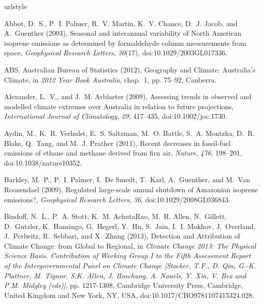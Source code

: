 \documentclass[draft,linenumbers]{AGUJournal}
\begin{document}
\begin{thebibliography}{51}
\providecommand{\natexlab}[1]{#1}
\expandafter\ifx\csname urlstyle\endcsname\relax
  \providecommand{\doi}[1]{doi:\discretionary{}{}{}#1}\else
  \providecommand{\doi}{doi:\discretionary{}{}{}\begingroup
  \urlstyle{rm}\Url}\fi

Abbot, D.~S., P.~I. Palmer, R.~V. Martin, K.~V. Chance, D.~J. Jacob, and
  A.~Guenther (2003), {Seasonal and interannual variability of North American
  isoprene emissions as determined by formaldehyde column measurements from
  space}, \textit{Geophysical Research Letters}, \textit{30}(17),
  \doi{10.1029/2003GL017336}.

ABS, Australian Bureau of Statistics (2012), {Geography and Climate: Australia's Climate}, in
  \textit{2012 Year Book Australia}, chap.~1, pp. 75--92, Canberra.

Alexander, L.~V., and J.~M. Arblaster (2009), {Assessing trends in observed and
  modelled climate extremes over Australia in relation to future projections},
  \textit{International Journal of Climatology}, \textit{29}, 417--435,
  \doi{10.1002/joc.1730}.

Aydin, M., K.~R. Verhulst, E.~S. Saltzman, M.~O. Battle, S.~A. Montzka, D.~R.
  Blake, Q.~Tang, and M.~J. Prather (2011), {Recent decreases in fossil-fuel
  emissions of ethane and methane derived from firn air}, \textit{Nature},
  \textit{476}, 198--201, \doi{10.1038/nature10352}.

Barkley, M.~P., P.~I. Palmer, I.~{De Smedt}, T.~Karl, A.~Guenther, and M.~{Van
  Roozendael} (2009), {Regulated large-scale annual shutdown of Amazonian
  isoprene emissions?}, \textit{Geophysical Research Letters}, \textit{36},
  \doi{10.1029/2008GL036843}.

Bindoff, N.~L., P.~A. Stott, K.~M. AchutaRao, M.~R. Allen, N.~Gillett,
  D.~Gutzler, K.~Hansingo, G.~Hegerl, Y.~Hu, S.~Jain, I.~I. Mokhov,
  J.~Overland, J.~Perlwitz, R.~Sebbari, and X.~Zhang (2013), {Detection and
  Attribution of Climate Change: from Global to Regional}, in \textit{Climate
  Change 2013: The Physical Science Basis. Contribution of Working Group I to
  the Fifth Assessment Report of the Intergovernmental Panel on Climate Change
  [Stocker, T.F., D. Qin, G.-K. Plattner, M. Tignor, S.K. Allen, J. Boschung,
  A. Nauels, Y. Xia, V. Bex and P.M. Midgley (eds)]}, pp. 1217-1308, Cambridge University Press, Cambridge,
  United Kingdom and New York, NY, USA, \doi{10.1017/CBO9781107415324.028}.


\end{thebibliography}
\end{document}
